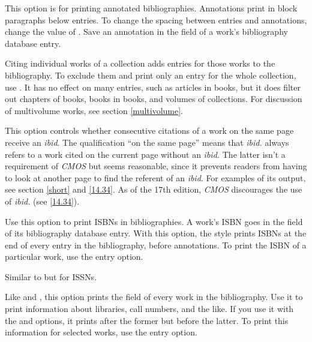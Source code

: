 \documentclass[11pt,letterpaper,oneside]{article}
\begin{document}
\begin{optionlist}


\noindent This option is for printing annotated bibliographies.
Annotations print in block paragraphs below entries. To change
the spacing between entries and annotations, change the value of
. Save an annotation in the 
field of a work's bibliography database entry.


\noindent Citing individual works of a collection adds entries for
those works to the bibliography. To exclude them and print only an
entry for the whole collection, use . It has no effect
on many  entries, such as articles in books, but
it does filter out chapters of books, books in books, and volumes of
collections. For discussion of multivolume works, see section
\ref{multivolume}.


\noindent This option controls whether consecutive citations of a work
on the same page receive an \textit{ibid}. The qualification ``on the
same page'' means that \textit{ibid.} always refers to a work cited on
the current page without an \textit{ibid.} The latter isn't a
requirement of \textit{CMOS} but seems reasonable, since it prevents
readers from having to look at another page to find the referent of an
\textit{ibid}. For examples of its output, see section \ref{short} and
\ref{14.34}. As of the 17th edition, \textit{CMOS} discourages the use
of \textit{ibid.} (see \ref{14.34}).


\noindent Use this option to print ISBNs in bibliographies. A work's
ISBN goes in the  field of its bibliography database
entry. With this option, the style prints ISBNs at the end of every
entry in the bibliography, before annotations. To print the ISBN of a
particular work, use the  entry option.


\noindent Similar to  but for ISSNs.


\noindent Like  and , this option prints the
 field of every work in the bibliography. Use it to
print information about libraries, call numbers, and the like. If you
use it with the  and  options, it prints
after the former but before the latter. To print this information for
selected works, use the  entry option.


\end{optionlist}
\end{document}
